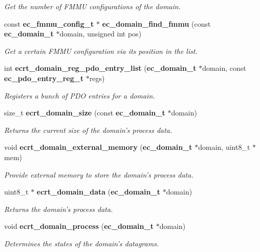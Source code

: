 \begin{DoxyCompactItemize}
\begin{DoxyCompactList}\small\item\em Get the number of F\-M\-M\-U configurations of the domain. \end{DoxyCompactList}\item 
const {\bf ec\-\_\-fmmu\-\_\-config\-\_\-t} $\ast$ {\bf ec\-\_\-domain\-\_\-find\-\_\-fmmu} (const {\bf ec\-\_\-domain\-\_\-t} $\ast$domain, unsigned int pos)
\begin{DoxyCompactList}\small\item\em Get a certain F\-M\-M\-U configuration via its position in the list. \end{DoxyCompactList}\item 
int {\bf ecrt\-\_\-domain\-\_\-reg\-\_\-pdo\-\_\-entry\-\_\-list} ({\bf ec\-\_\-domain\-\_\-t} $\ast$domain, const {\bf ec\-\_\-pdo\-\_\-entry\-\_\-reg\-\_\-t} $\ast$regs)
\begin{DoxyCompactList}\small\item\em Registers a bunch of P\-D\-O entries for a domain. \end{DoxyCompactList}\item 
size\-\_\-t {\bf ecrt\-\_\-domain\-\_\-size} (const {\bf ec\-\_\-domain\-\_\-t} $\ast$domain)
\begin{DoxyCompactList}\small\item\em Returns the current size of the domain's process data. \end{DoxyCompactList}\item 
void {\bf ecrt\-\_\-domain\-\_\-external\-\_\-memory} ({\bf ec\-\_\-domain\-\_\-t} $\ast$domain, uint8\-\_\-t $\ast$mem)
\begin{DoxyCompactList}\small\item\em Provide external memory to store the domain's process data. \end{DoxyCompactList}\item 
uint8\-\_\-t $\ast$ {\bf ecrt\-\_\-domain\-\_\-data} ({\bf ec\-\_\-domain\-\_\-t} $\ast$domain)
\begin{DoxyCompactList}\small\item\em Returns the domain's process data. \end{DoxyCompactList}\item 
void {\bf ecrt\-\_\-domain\-\_\-process} ({\bf ec\-\_\-domain\-\_\-t} $\ast$domain)
\begin{DoxyCompactList}\small\item\em Determines the states of the domain's datagrams. \end{DoxyCompactList}\item 

\end{DoxyCompactItemize}
